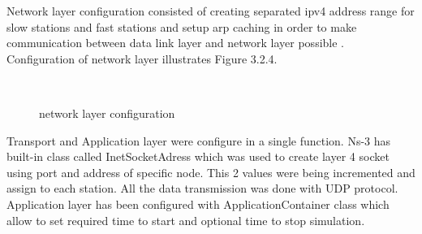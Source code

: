 \textnormal{\hspace{0.5cm}Network layer configuration consisted of creating separated ipv4 address range for slow stations and fast stations and setup arp caching in order to make communication between data link layer and network layer possible . Configuration of network layer illustrates Figure 3.2.4.}
\begin{center}
	\begin{figure}[h]
	\centering
	\\
	\caption{network layer configuration}
	\end{figure}
\end{center}  
\textnormal{\hspace{0.5cm}Transport and Application layer were configure in a single function. Ns-3 has built-in class called InetSocketAdress which was used to create layer 4 socket using port and address of specific node. This 2 values were being incremented and assign to each station. All the data transmission was done with UDP protocol. Application layer has been configured with ApplicationContainer class which allow to set required time to start and optional time to stop simulation.\newline\newline}

